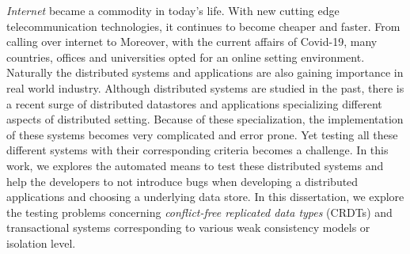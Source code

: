 

\vfill

\emph{Internet} became a commodity in today's life. With new cutting edge telecommunication technologies, it continues to become cheaper and faster. From calling over internet to Moreover, with the current affairs of Covid-19, many countries, offices and universities opted for an online setting environment. Naturally the distributed systems and applications are also gaining importance in real world industry. Although distributed systems are studied in the past, there is a recent surge of distributed datastores and applications specializing different aspects of distributed setting. Because of these specialization, the implementation of these systems becomes very complicated and error prone. Yet testing all these different systems with their corresponding criteria becomes a challenge. In this work, we explores the automated means to test these distributed systems and help the developers to not introduce bugs when developing a distributed applications and choosing a underlying data store. In this dissertation, we explore the testing problems concerning \emph{conflict-free replicated data types} (CRDTs) and transactional systems corresponding to various weak consistency models or isolation level.

